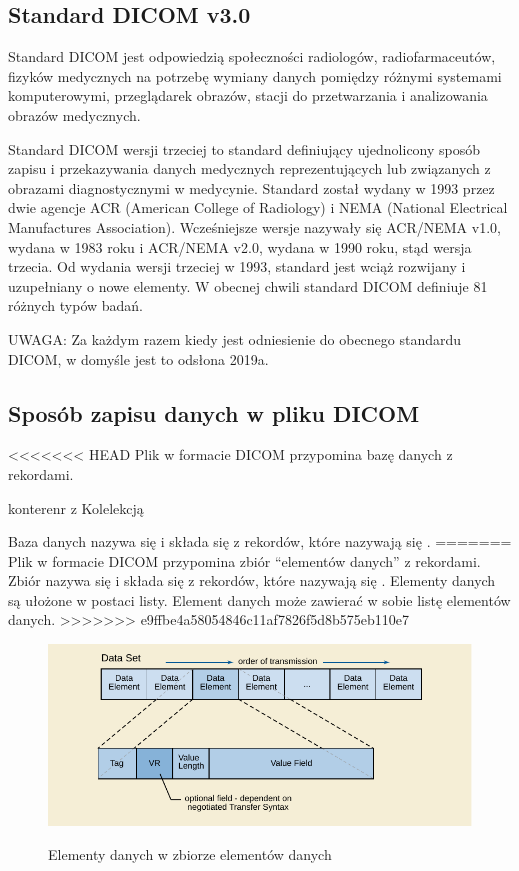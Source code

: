 \subsection{Standard DICOM v3.0}

\par
Standard DICOM jest odpowiedzią społeczności radiologów, radiofarmaceutów, fizyków medycznych na potrzebę wymiany danych pomiędzy różnymi systemami komputerowymi, przeglądarek obrazów,  stacji do przetwarzania i analizowania obrazów medycznych.

\par
Standard DICOM wersji trzeciej to standard definiujący ujednolicony sposób zapisu i przekazywania danych medycznych reprezentujących lub związanych z obrazami diagnostycznymi w medycynie.
Standard został wydany w 1993 przez dwie agencje ACR (American College of Radiology) i NEMA (National Electrical Manufactures Association).
Wcześniejsze wersje nazywały się ACR/NEMA v1.0, wydana w 1983 roku i ACR/NEMA v2.0, wydana w 1990 roku, stąd wersja trzecia.
Od wydania wersji trzeciej w 1993, standard jest wciąż rozwijany i uzupełniany o nowe elementy.
W obecnej chwili standard DICOM definiuje 81 różnych typów badań.

UWAGA: Za każdym razem kiedy jest odniesienie do obecnego standardu DICOM, w domyśle jest to odsłona 2019a.

\subsection{Sposób zapisu danych w pliku DICOM}

<<<<<<< HEAD
Plik w formacie DICOM przypomina bazę danych z rekordami.

konterenr z Kolelekcją

Baza danych nazywa się  i składa się z rekordów, które nazywają się .
=======
Plik w formacie DICOM przypomina zbiór \enquote{elementów danych} z rekordami.
Zbiór nazywa się  i składa się z rekordów, które nazywają się .
Elementy danych są ułożone w postaci listy.
Element danych może zawierać w sobie listę elementów danych.
>>>>>>> e9ffbe4a58054846c11af7826f5d8b575eb110e7

\begin{figure}[!htbp]
    \caption{Elementy danych w zbiorze elementów danych}
    \includegraphics[]{img/dicom-dataelement001.pdf}
    \centering
    \label{fig:dicom-dataelement}
\end{figure}

